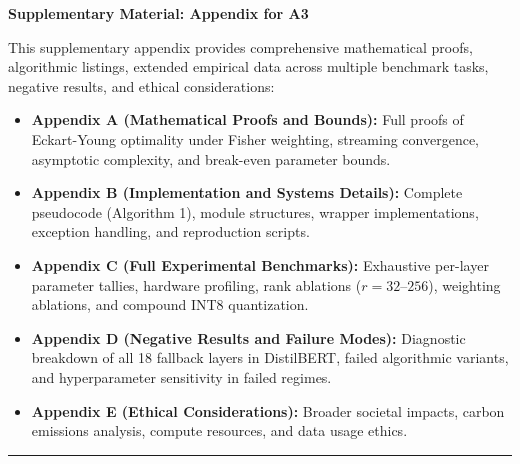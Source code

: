 \documentclass[10pt,twocolumn,letterpaper]{article}
\begin{document}













\clearpage
\appendix
\onecolumn
\begin{center}
{\Large\bfseries Supplementary Material: Appendix for A3}
\end{center}
\vspace{1em}

\noindent This supplementary appendix provides comprehensive mathematical proofs, algorithmic listings, extended empirical data across multiple benchmark tasks, negative results, and ethical considerations:
\begin{itemize}
    \item \textbf{Appendix A (Mathematical Proofs and Bounds):} Full proofs of Eckart-Young optimality under Fisher weighting, streaming convergence, asymptotic complexity, and break-even parameter bounds.
    \item \textbf{Appendix B (Implementation and Systems Details):} Complete pseudocode (Algorithm 1), module structures, wrapper implementations, exception handling, and reproduction scripts.
    \item \textbf{Appendix C (Full Experimental Benchmarks):} Exhaustive per-layer parameter tallies, hardware profiling, rank ablations ($r=32$--$256$), weighting ablations, and compound INT8 quantization.
    \item \textbf{Appendix D (Negative Results and Failure Modes):} Diagnostic breakdown of all 18 fallback layers in DistilBERT, failed algorithmic variants, and hyperparameter sensitivity in failed regimes.
    \item \textbf{Appendix E (Ethical Considerations):} Broader societal impacts, carbon emissions analysis, compute resources, and data usage ethics.
\end{itemize}
\vspace{1.5em}
\hrule
\vspace{1.5em}

\twocolumn






\end{document}

